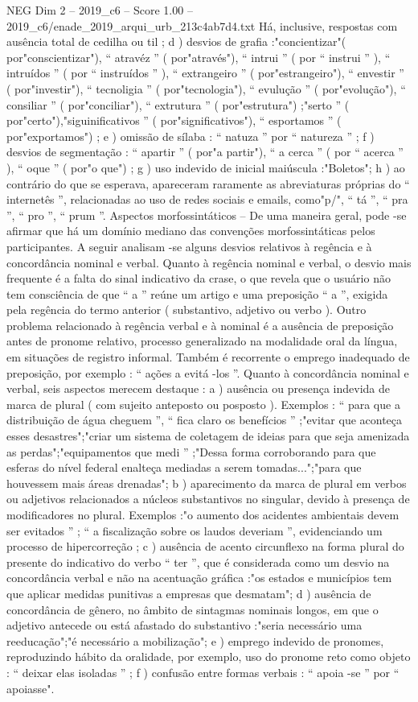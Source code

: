 \begin{textsample}{NEG Dim 2 – 2019\_c6 – Score 1.00 – 2019\_c6/enade\_2019\_arqui\_urb\_213c4ab7d4.txt}
Há, inclusive, respostas com ausência total de cedilha ou til ; d ) desvios de grafia :"concientizar"( por"conscientizar"), “ atravéz ” ( por"através"), “ intrui ” ( por “ instrui ” ), “ intruídos ” ( por “ instruídos ” ), “ extrangeiro ” ( por"estrangeiro"), “ envestir ” ( por"investir"), “ tecnoligia ” ( por"tecnologia"), “ evulução ” ( por"evolução"), “ consiliar ” ( por"conciliar"), “ extrutura ” ( por"estrutura") ;"serto ” ( por"certo"),"siguinificativos ” ( por"significativos"), “ esportamos ” ( por"exportamos") ; e ) omissão de sílaba : “ natuza ” por “ natureza ” ; f ) desvios de segmentação : “ apartir ” ( por"a partir"), “ a cerca ” ( por “ acerca ” ), “ oque ” ( por"o que") ; g ) uso indevido de inicial maiúscula :"Boletos"; h ) ao contrário do que se esperava, apareceram raramente as abreviaturas próprias do “ internetês ”, relacionadas ao uso de redes sociais e emails, como"p/", “ tá ”, “ pra ”, “ pro ”, “ prum ”.
Aspectos morfossintáticos – De uma maneira geral, pode -se afirmar que há um domínio mediano das convenções morfossintáticas pelos participantes.
A seguir analisam -se alguns desvios relativos à regência e à concordância nominal e verbal.
Quanto à regência nominal e verbal, o desvio mais frequente é a falta do sinal indicativo da crase, o que revela que o usuário não tem consciência de que “ a ” reúne um artigo e uma preposição “ a ”, exigida pela regência do termo anterior ( substantivo, adjetivo ou verbo ).
Outro problema relacionado à regência verbal e à nominal é a ausência de preposição antes de pronome relativo, processo generalizado na modalidade oral da língua, em situações de registro informal.
Também é recorrente o emprego inadequado de preposição, por exemplo : “ ações a evitá -los ”.
Quanto à concordância nominal e verbal, seis aspectos merecem destaque : a ) ausência ou presença indevida de marca de plural ( com sujeito anteposto ou posposto ).
Exemplos : “ para que a distribuição de água cheguem ”, “ fica claro os benefícios ” ;"evitar que aconteça esses desastres";"criar um sistema de coletagem de ideias para que seja amenizada as perdas";"equipamentos que medi ” ;"Dessa forma corroborando para que esferas do nível federal enalteça mediadas a serem tomadas...";"para que houvessem mais áreas drenadas"; b ) aparecimento da marca de plural em verbos ou adjetivos relacionados a núcleos substantivos no singular, devido à presença de modificadores no plural.
Exemplos :"o aumento dos acidentes ambientais devem ser evitados ” ; “ a fiscalização sobre os laudos deveriam ”, evidenciando um processo de hipercorreção ; c ) ausência de acento circunflexo na forma plural do presente do indicativo do verbo “ ter ”, que é considerada como um desvio na concordância verbal e não na acentuação gráfica :"os estados e municípios tem que aplicar medidas punitivas a empresas que desmatam"; d ) ausência de concordância de gênero, no âmbito de sintagmas nominais longos, em que o adjetivo antecede ou está afastado do substantivo :"seria necessário uma reeducação";"é necessário a mobilização"; e ) emprego indevido de pronomes, reproduzindo hábito da oralidade, por exemplo, uso do pronome reto como objeto : “ deixar elas isoladas ” ; f ) confusão entre formas verbais : “ apoia -se ” por “ apoiasse".

\end{textsample}
